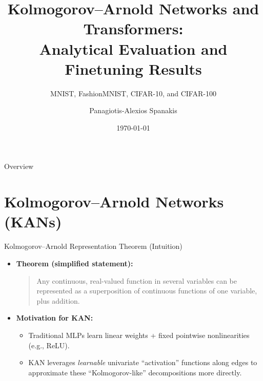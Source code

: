 \documentclass{beamer}
\title{Kolmogorov--Arnold Networks and Transformers:\\
Analytical Evaluation and Finetuning Results}
\subtitle{MNIST, FashionMNIST, CIFAR-10, and CIFAR-100}
\author{Panagiotis-Alexios Spanakis}
\institute{National Technical University of Athens}
\date{\today}
\begin{document}
\begin{frame}
    \titlepage
\end{frame}

\begin{frame}{Overview}
    \tableofcontents
\end{frame}

\section{Kolmogorov--Arnold Networks (KANs)}
\begin{frame}{Kolmogorov--Arnold Representation Theorem (Intuition)}
    \begin{itemize}
        \item \textbf{Theorem (simplified statement):}
              \begin{quote}
                  Any continuous, real-valued function in several variables can be represented as a superposition of continuous functions of one variable, plus addition.
              \end{quote}
        \item \textbf{Motivation for KAN:}
              \begin{itemize}
                  \item Traditional MLPs learn linear weights + fixed pointwise nonlinearities (e.g., ReLU).
                  \item KAN leverages \emph{learnable} univariate ``activation'' functions along edges to approximate these ``Kolmogorov-like'' decompositions more directly.
              \end{itemize}
    \end{itemize}
\end{frame}
\end{document}
